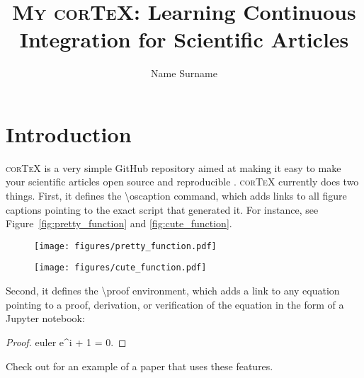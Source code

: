 \documentclass[modern]{aastex62}
\begin{document}
\title{\textsc{My corTeX}: Learning Continuous Integration for Scientific Articles}

\author[0000-0000-0000-0000]{Name Surname}


\section{Introduction}
\label{sec:intro}
%
\textsc{corTeX} is a very simple \textsf{GitHub} repository aimed at making
it easy to make your scientific articles open source and reproducible \citep{Luger2018}.
\textsc{corTeX} currently does two things. First, it defines the
\textsf{\textbackslash oscaption} command, which adds
links to all figure captions pointing to the exact script that generated it.
For instance, see Figure~\ref{fig:pretty_function} and \ref{fig:cute_function}.
%
\begin{figure}[h!]
    \begin{centering}
    \texttt{[image: figures/pretty\_function.pdf]}
    \end{centering}
\end{figure}

%
\begin{figure}[h!]
    \begin{centering}
    \texttt{[image: figures/cute\_function.pdf]}
    \end{centering}
\end{figure}



Second, it defines the \textsf{\textbackslash proof} environment, which
adds a link to any equation pointing to a proof, derivation, or
verification of the equation in the form of a \textsf{Jupyter} notebook:
\begin{proof}{euler}
    \label{eq:euler}
    e^{i\pi} + 1 = 0.
\end{proof}
Check out \citet{Luger2018} for an example of a paper that uses these
features.

\pagebreak

\end{document}
